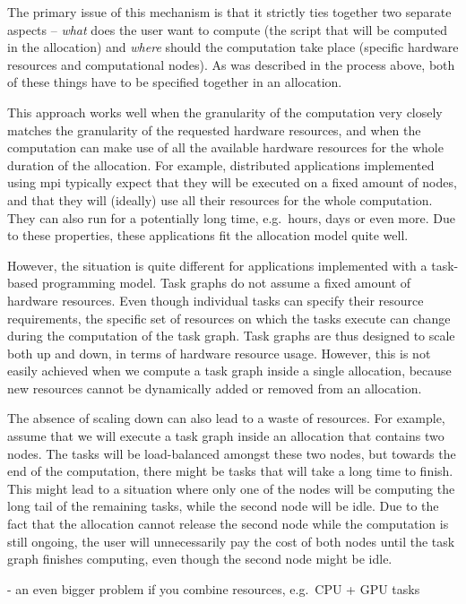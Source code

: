 The primary issue of this mechanism is that it strictly ties together two separate aspects --
\emph{what} does the user want to compute (the script that will be computed in the
allocation) and \emph{where} should the computation take place (specific hardware
resources and computational nodes). As was described in the process above, both of these things
have to be specified together in an allocation.

This approach works well when the granularity of the computation very closely matches the
granularity of the requested hardware resources, and when the computation can make use of all the
available hardware resources for the whole duration of the allocation. For example, distributed
applications implemented using \gls{mpi} typically expect that they will be executed
on a fixed amount of nodes, and that they will (ideally) use all their resources for the whole
computation. They can also run for a potentially long time, e.g.\ hours, days or even more. Due to
these properties, these applications fit the allocation model quite well.

However, the situation is quite different for applications implemented with a task-based
programming model. Task graphs do not assume a fixed amount of hardware resources. Even though
individual tasks can specify their resource requirements, the specific set of resources on which
the tasks execute can change during the computation of the task graph. Task graphs are thus
designed to scale both up and down, in terms of hardware resource usage. However, this is not
easily achieved when we compute a task graph inside a single allocation, because new resources
cannot be dynamically added or removed from an allocation.

The absence of scaling down can also lead to a waste of resources. For example, assume that we will
execute a task graph inside an allocation that contains two nodes. The tasks will be load-balanced
amongst these two nodes, but towards the end of the computation, there might be tasks that will
take a long time to finish. This might lead to a situation where only one of the nodes will be
computing the long tail of the remaining tasks, while the second node will be idle. Due to the fact
that the allocation cannot release the second node while the computation is still ongoing, the user
will unnecessarily pay the cost of both nodes until the task graph finishes computing, even though
the second node might be idle.

- an even bigger problem if you combine resources, e.g.\ CPU + GPU tasks





